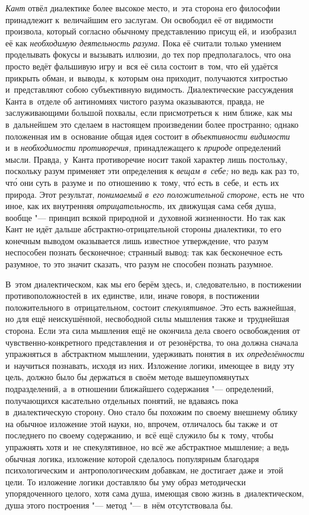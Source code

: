 {\em Кант} отвёл диалектике более высокое место, и~эта
сторона его философии принадлежит к~величайшим его заслугам. Он освободил
её от видимости произвола, который согласно обычному представлению присущ
ей, и~изобразил её как {\em необходимую деятельность разума}.
Пока её считали только умением проделывать фокусы и
вызывать иллюзии, до тех пор предполагалось, что она просто ведёт фальшивую
игру и~вся её сила состоит в~том, что ей удаётся прикрыть обман, и~выводы,
к~которым она приходит, получаются хитростью и~представляют собою
субъективную видимость. Диалектические рассуждения Канта в~отделе об
антиномиях чистого разума оказываются, правда, не заслуживающими большой
похвалы, если присмотреться к~ним ближе, как мы в~дальнейшем это сделаем в
настоящем произведении более пространно; однако положенная им в~основание
общая идея состоит в {\em объективности видимости} и~в
{\em необходимости противоречия,} принадлежащего к {\em природе}
определений мысли.
Правда, у~Канта противоречие носит такой характер лишь постольку, поскольку
разум применяет эти определения к {\em вещам в~себе;}
но ведь как раз то, чт\'{о} они суть в~разуме и~по отношению к~тому,
чт\'{о} есть в~себе, и~есть их природа. Этот результат,
{\em понимаемый в~его положительной стороне,} есть не~что иное,
как их внутренняя {\em отрицательность,} их
движущая сама себя душа, вообще "--- принцип всякой природной и~духовной
жизненности. Но так как Кант не идёт дальше абстрактно-отрицательной
стороны диалектики, то его конечным выводом оказывается лишь известное
утверждение, что разум неспособен познать бесконечное; странный вывод: так
как бесконечное есть разумное, то это значит сказать, что разум не способен
познать разумное.

В~этом диалектическом, как мы его берём здесь, и, следовательно, в
постижении противоположностей в~их единстве, или, иначе говоря, в
постижении положительного в~отрицательном, состоит
{\em спекулятивное}. Это есть важнейшая, но для ещё
неискушённой, несвободной силы мышления также и~труднейшая сторона. Если
эта сила мышления ещё не окончила дела своего освобождения от
чувственно-конкретного представления и~от резонёрства, то она должна
сначала упражняться в~абстрактном мышлении, удерживать понятия в~их
{\em определённости} и~научиться познавать, исходя из
них. Изложение логики, имеющее в~виду эту цель, должно было бы держаться в
своём методе вышеупомянутых подразделений, а~в отношении ближайшего
содержания "--- определений, получающихся касательно отдельных понятий, не
вдаваясь пока в~диалектическую сторону. Оно стало бы похожим по своему
внешнему облику на обычное изложение этой науки, но, впрочем, отличалось бы
также и~от последнего по своему содержанию, и~всё ещё служило бы к~тому,
чтобы упражнять хотя и~не спекулятивное, но всё же абстрактное мышление; а
ведь обычная логика, изложение которой сделалось популярным благодаря
психологическим и~антропологическим добавкам, не достигает даже и~этой
цели. То изложение логики доставляло бы уму образ методически
упорядоченного целого, хотя сама душа, имеющая свою жизнь в~диалектическом,
душа этого построения "--- метод "--- в~нём отсутствовала бы.

